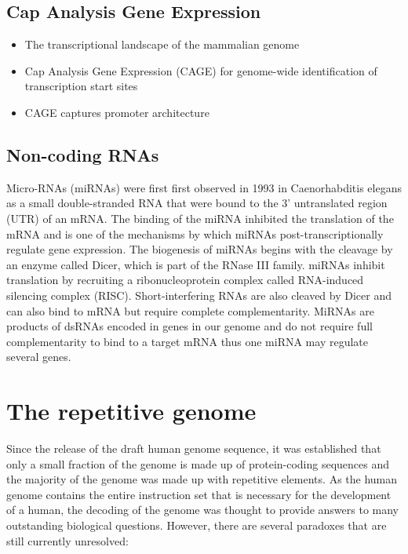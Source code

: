 \subsection{Cap Analysis Gene Expression}

\begin{itemize}

   \item The transcriptional landscape of the mammalian genome\cite{pmid16141072}
   \item Cap Analysis Gene Expression (CAGE) for genome-wide identification of transcription start sites
   \item CAGE captures promoter architecture\cite{pmid16645617}

\end{itemize}

\subsection{Non-coding RNAs}

Micro-RNAs (miRNAs) were first first observed in 1993 in Caenorhabditis elegans\cite{pmid8252621} as a small double-stranded RNA that were bound to the 3' untranslated region (UTR) of an mRNA. The binding of the miRNA inhibited the translation of the mRNA and is one of the mechanisms by which miRNAs post-transcriptionally regulate gene expression. The biogenesis of miRNAs begins with the cleavage by an enzyme called Dicer\cite{pmid11201747}, which is part of the RNase III family. miRNAs inhibit translation by recruiting a ribonucleoprotein complex called RNA-induced silencing complex (RISC). Short-interfering RNAs are also cleaved by Dicer and can also bind to mRNA but require complete complementarity. MiRNAs are products of dsRNAs encoded in genes in our genome and do not require full complementarity to bind to a target mRNA thus one miRNA may regulate several genes. 

\section{The repetitive genome}

Since the release of the draft human genome sequence\cite{venter2001sequence, lander2001initial}, it was established that only a small fraction of the genome is made up of protein-coding sequences and the majority of the genome was made up with repetitive elements. As the human genome contains the entire instruction set that is necessary for the development of a human, the decoding of the genome was thought to provide answers to many outstanding biological questions. However, there are several paradoxes that are still currently unresolved:

